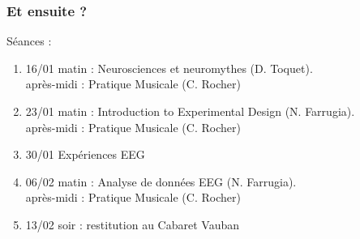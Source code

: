 \documentclass[xcolor=dvipsnames,english]{beamer}
\begin{document}
\begin{frame}
  \frametitle{Et ensuite ?}
  Séances : 
  \begin{enumerate}
  \item 16/01 matin : Neurosciences et neuromythes (D. Toquet).\\ après-midi : Pratique Musicale (C. Rocher)
  \item 23/01 matin : Introduction to Experimental Design (N. Farrugia). \\ après-midi : Pratique Musicale (C. Rocher)
  \item 30/01 Expériences EEG
  \item 06/02 matin : Analyse de données EEG (N. Farrugia). \\après-midi : Pratique Musicale (C. Rocher)
  \item 13/02 soir : restitution au Cabaret Vauban 
  \end{enumerate}
  \end{frame}
\end{document}
